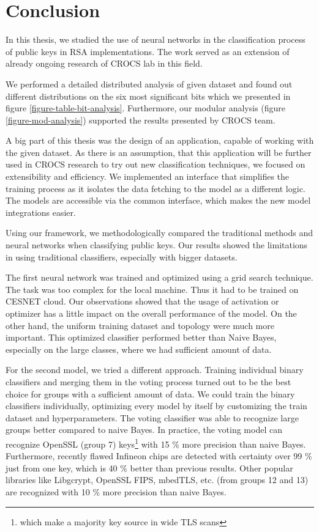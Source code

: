 \chapter{Conclusion}

In this thesis, we studied the use of neural networks in the classification process of public keys in RSA implementations. The work served as an extension of already ongoing research of CROCS lab in this field. 

We performed a detailed distributed analysis of given dataset and found out different distributions on the six most significant bits which we presented in figure \ref{figure-table-bit-analysis}. Furthermore, our modular analysis (figure \ref{figure-mod-analysis}) supported the results presented by CROCS team.

A big part of this thesis was the design of an application, capable of working with the given dataset. As there is an assumption, that this application will be further used in CROCS research to try out new classification techniques, we focused on extensibility and efficiency. We implemented an interface that simplifies the training process as it isolates the data fetching to the model as a different logic. The models are accessible via the common interface, which makes the new model integrations easier.

Using our framework, we methodologically compared the traditional methods and neural networks when classifying public keys. Our results showed the limitations in using traditional classifiers, especially with bigger datasets.

The first neural network was trained and optimized using a grid search technique. The task was too complex for the local machine. Thus it had to be trained on CESNET cloud. Our observations showed that the usage of activation or optimizer has a little impact on the overall performance of the model. On the other hand, the uniform training dataset and topology were much more important. This optimized classifier performed better than Naive Bayes, especially on the large classes, where we had sufficient amount of data.

For the second model, we tried a different approach. Training individual binary classifiers and merging them in the voting process
turned out to be the best choice for groups with a sufficient amount of data. We could train the binary classifiers individually, optimizing every model by itself by customizing the train dataset and hyperparameters. The voting classifier was able to recognize large groups better compared to naive Bayes. In practice, the voting model can recognize OpenSSL (group 7) keys\footnote{which make a majority key source in wide TLS scans} with 15 \% more precision than naive Bayes. Furthermore, recently flawed Infineon chips are detected with certainty over 99 \% just from one key, which is 40 \% better than previous results. Other popular libraries like Libgcrypt, OpenSSL FIPS, mbedTLS, etc. (from groups 12 and 13) are recognized with 10 \% more precision than naive Bayes. 

